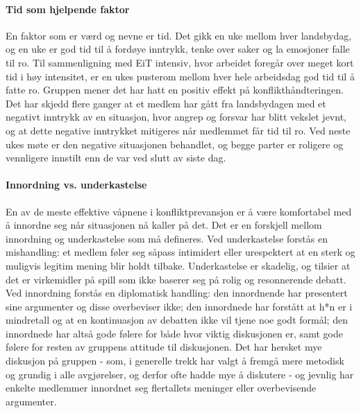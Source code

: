 \paragraph{Tid som hjelpende faktor}
En faktor som er værd og nevne er tid. Det gikk en uke mellom hver landsbydag, og en uke er god tid til å fordøye inntrykk, tenke over saker og la emosjoner falle til ro. Til sammenligning med EiT intensiv, hvor arbeidet foregår over meget kort tid i høy intensitet, er en ukes pusterom mellom hver hele arbeidsdag god tid til å fatte ro. Gruppen mener det har hatt en positiv effekt på konflikthåndteringen. Det har skjedd flere ganger at et medlem har gått fra landsbydagen med et negativt inntrykk av en situasjon, hvor angrep og forsvar har blitt vekslet jevnt, og at dette negative inntrykket mitigeres når medlemmet får tid til ro. Ved neste ukes møte er den negative situasjonen behandlet, og begge parter er roligere og vennligere innstilt enn de var ved slutt av siste dag.

\paragraph{Innordning vs. underkastelse}
En av de meste effektive våpnene i konfliktprevansjon er å være komfortabel med å innordne seg når situasjonen nå kaller på det. Det er en forskjell mellom innordning og underkastelse som må defineres. Ved underkastelse forstås en mishandling: et medlem føler seg såpass intimidert eller urespektert at en sterk og muligvis legitim mening blir holdt tilbake. Underkastelse er skadelig, og tilsier at det er virkemidler på spill som ikke baserer seg på rolig og resonnerende debatt. Ved innordning forstås en diplomatisk handling: den innordnende har presentert sine argumenter og disse overbeviser ikke; den innordnede har forstått at h*n er i mindretall og at en kontinuasjon av debatten ikke vil tjene noe godt formål; den innordnede har altså gode følere for både hvor viktig diskusjonen er, samt gode følere for resten av gruppens attitude til diskusjonen. Det har hersket mye diskusjon på gruppen - som, i generelle trekk har valgt å fremgå mere metodisk og grundig i alle avgjørelser, og derfor ofte hadde mye å diskutere - og jevnlig har enkelte medlemmer innordnet seg flertallets meninger eller overbevisende argumenter. 

